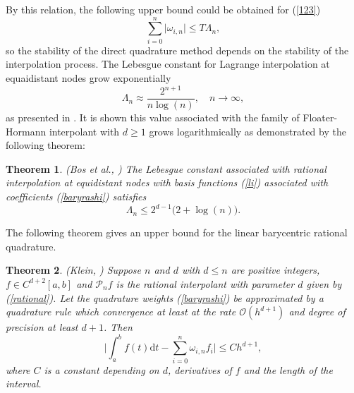 \documentclass[fleqn,final,3p,11pt]{elsarticle}
\newtheorem{theorem}{Theorem}[section]
\theoremstyle{definition}
\theoremstyle{remark}
\numberwithin{equation}{section}
\begin{document}
By this relation, the following upper bound could be obtained for (\ref{123})
\begin{equation}
\sum_{i=0}^{n}\vert \omega_{i,n}\vert \leq T\Lambda_{n},
\end{equation}
so the stability of the direct quadrature method depends on the stability of the interpolation process.
The Lebesgue constant for Lagrange interpolation at equaidistant nodes grow exponentially
 \[\Lambda_{n}\approx \frac{2^{n+1}}{n\log(n)}, \quad n \rightarrow \infty,\]
 as presented in \cite{bary}.
 It is shown this value associated with the family of Floater-Hormann interpolant with $d\geq 1$ grows logarithmically as demonstrated by the following theorem:
 \begin{theorem}(Bos et al., \cite{bos})
 The Lebesgue constant associated with rational interpolation at equidistant nodes with basis functions (\ref{li}) associated with coefficients
(\ref{baryrashi}) satisfies
\[\Lambda_{n} \leq 2^{d-1}\Big(2+\log(n)\Big).\]
 \end{theorem}
The following theorem gives an upper bound for the linear barycentric rational quadrature.
\begin{theorem}\label{quad}(Klein, \cite[Theorem 4.1]{kleinthesis})
Suppose $n$ and $d$ with $d\leq n$ are positive integers,  $ f \in C^{d+2}[a, b] $ and $ \mathcal{P}_{n}f $ is the rational interpolant with parameter $d$ given by (\ref{rational}). Let the quadrature weights (\ref{baryrashi}) be approximated by a quadrature rule which convergence at least at the rate $ \mathcal{O}(h^{d+1}) $ and degree of precision at least $d+1$. Then
	\begin{equation}
	\Big\vert \int_{a}^{b}f(t)\mathrm{d}t - \sum_{i=0}^{n}\omega_{i,n}f_{i} \Big\vert \leq C h^{d+1},
	\end{equation}
where $ C $ is a constant depending on $ d $, derivatives of $ f $ and the length of the interval.
\end{theorem}
\end{document}
